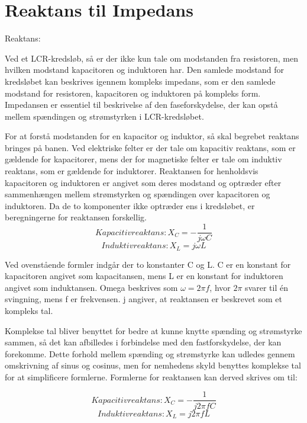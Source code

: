 \section{Reaktans til Impedans}
Reaktans:

Ved et LCR-kredsløb, så er der ikke kun tale om modstanden fra resistoren, men hvilken modstand kapacitoren og induktoren har. Den samlede modstand for kredsløbet kan beskrives igennem kompleks impedans, som er den samlede modstand for resistoren, kapacitoren og induktoren på kompleks form. Impedansen er essentiel til beskrivelse af den faseforskydelse, der kan opstå mellem spændingen og strømstyrken i LCR-kredsløbet.

For at forstå modstanden for en kapacitor og induktor, så skal begrebet reaktans bringes på banen. Ved elektriske felter er der tale om kapacitiv reaktans, som er gældende for kapacitorer, mens der for magnetiske felter er tale om induktiv reaktans, som er gældende for induktorer. Reaktansen for henholdsvis kapacitoren og induktoren er angivet som deres modstand og optræder efter sammenhængen mellem strømstyrken og spændingen over kapacitoren og induktoren. Da de to komponenter ikke optræder ens i kredsløbet, er beregningerne for reaktansen forskellig.
\begin{equation}
Kapacitiv reaktans: X_C = - \frac{1}{j \omega C}
\label{eq:kapacitivreaktans}
\end{equation}
\begin{equation}
Induktiv reaktans: X_L = j \omega L
\label{eq:induktivreaktans}
\end{equation}

Ved ovenstående formler indgår der to konstanter C og L. C er en konstant for kapacitoren angivet som kapacitansen, mens L er en konstant for induktoren angivet som induktansen. Omega beskrives som $\omega = 2 \pi f$, hvor $2 \pi$ svarer til én svingning, mens f er frekvensen. j angiver, at reaktansen er beskrevet som et kompleks tal.

Komplekse tal bliver benyttet for bedre at kunne knytte spænding og strømstyrke sammen, så det kan afbilledes i forbindelse med den fastforskydelse, der kan forekomme. Dette forhold mellem spænding og strømstyrke kan udledes gennem omskrivning af sinus og cosinus, men for nemhedens skyld benyttes komplekse tal for at simplificere formlerne. Formlerne for reaktansen kan derved skrives om til:

\begin{equation} 
Kapacitiv reaktans: X_C = - \frac{1}{j 2 \pi f C}
\end{equation}
\begin{equation}
Induktiv reaktans: X_L = j 2 \pi f L
\end{equation}

